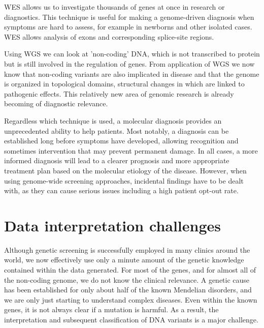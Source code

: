 WES allows us to investigate thousands of genes at once in research or diagnostics\cite{Yang_2013}.
This technique is useful for making a genome-driven diagnosis when symptoms are hard to assess, for example in newborns\cite{van_Diemen_2017} and other isolated cases\cite{Wilfert_2016}.
WES allows analysis of exons and corresponding splice-site regions.

Using WGS we can look at 'non-coding' DNA, which is not transcribed to protein but is still involved in the regulation of genes.
From application of WGS we now know that non-coding variants are also implicated in disease\cite{Javierre_2016} and that the genome is organized in topological domains\cite{Dixon_2012}, structural changes in which are linked to pathogenic effects\cite{Franke_2016}.
This relatively new area of genomic research is already becoming of diagnostic relevance\cite{Smedley_2016}.

Regardless which technique is used, a molecular diagnosis provides an unprecedented ability to help patients.
Most notably, a diagnosis can be established long before symptoms have developed, allowing recognition and sometimes intervention that may prevent permanent damage\cite{Saunders_2012}.
In all cases, a more informed diagnosis will lead to a clearer prognosis and more appropriate treatment plan based on the molecular etiology of the disease.
However, when using genome-wide screening approaches, incidental findings have to be dealt with\cite{Green_2013b}, as they can cause serious issues including a high patient opt-out rate\cite{Harris_2016}.

\section{Data interpretation challenges} \label{intro_bioinfchall}

Although genetic screening is successfully employed in many clinics around the world, we now effectively use only a minute amount of the genetic knowledge contained within the data generated.
For most of the genes, and for almost all of the non-coding genome, we do not know the clinical relevance.
A genetic cause has been established for only about half of the known Mendelian disorders, and we are only just starting to understand complex diseases\cite{McCarthy_2008}.
Even within the known genes, it is not always clear if a mutation is harmful\cite{Cooper_2015,Chen_2016}.
As a result, the interpretation and subsequent classification of DNA variants is a major challenge.

